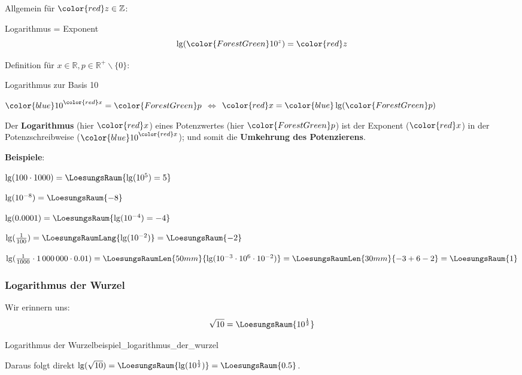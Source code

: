 \vspace{5mm}

Allgemein für ${\color{red}z}\in \mathbb{Z}$:

\begin{gesetz}{Logarithmus = Exponent}{}
  $$\lg({\color{ForestGreen} 10^z}) = {\color{red} z}$$
\end{gesetz}


Definition für $x\in\mathbb{R}, p \in \mathbb{R}^{+}\backslash\{0\}$:
\begin{definition}{Logarithmus zur Basis 10}{}
  \begin{center}
    ${\color{blue}10}^{\color{red}x}={\color{ForestGreen}p}$
    $\Longleftrightarrow$
    ${\color{red}x} = {\color{blue}\lg}({\color{ForestGreen}p})$
    \end{center}
\end{definition}

\begin{bemerkung}{}{}
  Der \textbf{Logarithmus} (hier $\color{red}x$) eines Potenzwertes
  (hier $\color{ForestGreen}p$) ist der Exponent ($\color{red}x$) in der
  Potenzschreibweise (${\color{blue}10}^{\color{red}x}$); und somit die \textbf{Umkehrung des Potenzierens}.
\end{bemerkung}

\textbf{Beispiele}:\\
\leserluft{}

$\lg(100 \cdot{} 1000) = \LoesungsRaum{\lg(10^5)=5}$
\leserluft{}

$\lg(10^{-8}) = \LoesungsRaum{-8}$
\leserluft{}

$\lg(0.0001) = \LoesungsRaum{\lg(10^{-4})=-4}$

$\lg(\frac1{100}) =\LoesungsRaumLang{\lg(10^{-2}) } = \LoesungsRaum{-2}$
\leserluft{}

$\lg(\frac1{1000}\cdot{} 1\,000\,000 \cdot{} 0.01)
=\LoesungsRaumLen{50mm}{\lg(10^{-3} \cdot{} 10^6 \cdot{} 10^{-2}) } =
\LoesungsRaumLen{30mm}{-3 + 6 - 2} = \LoesungsRaum{1}$

\newpage
\subsubsection{Logarithmus der Wurzel}
Wir erinnern uns: $$\sqrt{10} =\LoesungsRaum{ 10^\frac12}$$
\begin{beispiel}{Logarithmus der
    Wurzel}{beispiel_logarithmus_der_wurzel}

  Daraus folgt direkt $\lg(\sqrt{10}) = \LoesungsRaum{\lg(10^\frac12)}  = \LoesungsRaum{0.5}$.
\end{beispiel}

